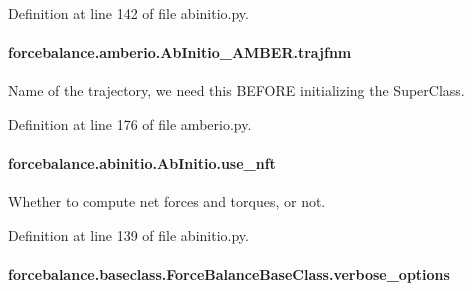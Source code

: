 Definition at line 142 of file abinitio.\-py.

\hypertarget{classforcebalance_1_1amberio_1_1AbInitio__AMBER_a5521a1a249650355e3e1f20eb3a0c25b}{
\paragraph[{trajfnm}]{\setlength{\rightskip}{0pt plus 5cm}forcebalance.\-amberio.\-Ab\-Initio\-\_\-\-A\-M\-B\-E\-R.\-trajfnm}}\label{classforcebalance_1_1amberio_1_1AbInitio__AMBER_a5521a1a249650355e3e1f20eb3a0c25b}


Name of the trajectory, we need this B\-E\-F\-O\-R\-E initializing the Super\-Class. 



Definition at line 176 of file amberio.\-py.

\hypertarget{classforcebalance_1_1abinitio_1_1AbInitio_afd8d179560a295ffa6c6309843c59279}{
\paragraph[{use\-\_\-nft}]{\setlength{\rightskip}{0pt plus 5cm}forcebalance.\-abinitio.\-Ab\-Initio.\-use\-\_\-nft\hspace{0.3cm}{\ttfamily [inherited]}}}\label{classforcebalance_1_1abinitio_1_1AbInitio_afd8d179560a295ffa6c6309843c59279}


Whether to compute net forces and torques, or not. 



Definition at line 139 of file abinitio.\-py.

\hypertarget{classforcebalance_1_1baseclass_1_1ForceBalanceBaseClass_a8088e1e20cbd6bc175fb9c9fe9fa0f18}{
\paragraph[{verbose\-\_\-options}]{\setlength{\rightskip}{0pt plus 5cm}forcebalance.\-baseclass.\-Force\-Balance\-Base\-Class.\-verbose\-\_\-options\hspace{0.3cm}{\ttfamily [inherited]}}}\label{classforcebalance_1_1baseclass_1_1ForceBalanceBaseClass_a8088e1e20cbd6bc175fb9c9fe9fa0f18}


